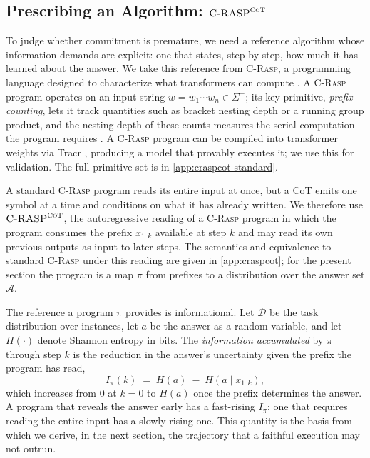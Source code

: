 \documentclass[11pt]{article}
\newcommand{\stepk}{k}
\newcommand{\CRASPCoT}{\textsc{C-RASP}^{\textsc{CoT}}}
\begin{document}
\subsection{Prescribing an Algorithm: \texorpdfstring{$\CRASPCoT$}{C-RASP-CoT}}
\label{sec:prelim-crasp}

To judge whether commitment is premature, we need a reference algorithm whose
information demands are explicit: one that states, step by step, how much it has
learned about the answer. We take this reference from \textsc{C-Rasp}, a
programming language designed to characterize what transformers can compute
\citep{DBLP:conf/icml/WeissGY21,
DBLP:journals/corr/abs-2404-04393,DBLP:conf/nips/YangCCN25}. A \textsc{C-Rasp}
program operates on an input string $w = w_{1}\cdots w_{n} \in \Sigma^{+}$; its
key primitive, \emph{prefix counting}, lets it track quantities such as bracket
nesting depth or a running group product, and the nesting depth of these counts
measures the serial computation the program requires
\citep{DBLP:conf/nips/YangCCN25}. A \textsc{C-Rasp} program can be compiled
into transformer weights via Tracr \citep{DBLP:conf/nips/LindnerKFRMM23},
producing a model that provably executes it; we use this for validation. The
full primitive set is in \cref{app:craspcot-standard}.

A standard \textsc{C-Rasp} program reads its entire input at once, but a CoT
emits one symbol at a time and conditions on what it has already written. We
therefore use $\CRASPCoT$, the autoregressive reading of a \textsc{C-Rasp}
program in which the program consumes the prefix $x_{1{:}\stepk}$ available at
step $\stepk$ and may read its own previous outputs as input to later steps.
The semantics and equivalence to standard \textsc{C-Rasp} under this reading are
given in \cref{app:craspcot}; for the present section the program is a map
$\pi$ from prefixes to a distribution over the answer set $\mathcal{A}$.

The reference a program $\pi$ provides is informational. Let $\mathcal{D}$ be
the task distribution over instances, let $a$ be the answer as a random
variable, and let $H(\cdot)$ denote Shannon entropy in bits. The
\emph{information accumulated} by $\pi$ through step $\stepk$ is the reduction
in the answer's uncertainty given the prefix the program has read,
\begin{equation}
\label{eq:infoacc}
I_{\pi}(\stepk) \;=\; H(a) \;-\; H\!\left(a \mid x_{1{:}\stepk}\right),
\end{equation}
which increases from $0$ at $\stepk = 0$ to $H(a)$ once the prefix determines
the answer. A program that reveals the answer early has a fast-rising
$I_{\pi}$; one that requires reading the entire input has a slowly rising one.
This quantity is the basis from which we derive, in the next section, the
trajectory that a faithful execution may not outrun.
\end{document}
